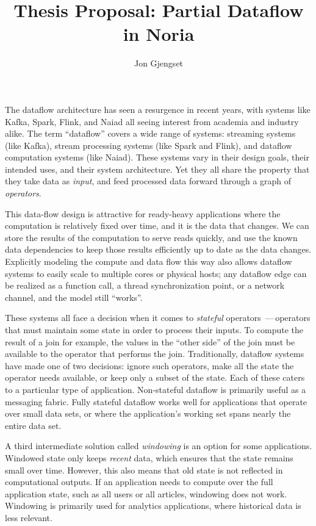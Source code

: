 \documentclass[12pt,letterpaper,twoside]{article}
\title{Thesis Proposal: Partial Dataflow in Noria}
\author{Jon Gjengset}
\begin{document}
\maketitle

The dataflow architecture has seen a resurgence in recent years, with systems
like Kafka\cite{kafka}, Spark\cite{spark,spark-streaming}, Flink\cite{flink}, and
Naiad\cite{naiad} all seeing interest from academia and industry alike. The term
``dataflow'' covers a wide range of systems: streaming systems (like Kafka),
stream processing systems (like Spark and Flink), and dataflow computation
systems (like Naiad). These systems vary in their design goals, their intended
uses, and their system architecture. Yet they all share the property that they
take data as \emph{input}, and feed processed data forward through a graph of
\emph{operators}.

This data-flow design is attractive for ready-heavy applications where the
computation is relatively fixed over time, and it is the data that changes.
We can store the results of the computation to serve reads quickly, and use the
known data dependencies to keep those results efficiently up to date as the data
changes. Explicitly modeling the compute and data flow this way also allows
dataflow systems to easily scale to multiple cores or physical hosts; any
dataflow edge can be realized as a function call, a thread synchronization
point, or a network channel, and the model still ``works''.

These systems all face a decision when it comes to \emph{stateful} operators\,
---\,operators that must maintain some state in order to process their inputs.
To compute the result of a join for example, the values in the ``other side'' of
the join must be available to the operator that performs the join.
Traditionally, dataflow systems have made one of two decisions: ignore such
operators, make all the state the operator needs available, or keep only a
subset of the state. Each of these caters to a particular type of application.
Non-stateful dataflow is primarily useful as a messaging fabric. Fully stateful
dataflow works well for applications that operate over small data sets, or where
the application's working set spans nearly the entire data set.

A third intermediate solution called \emph{windowing} is an option for some
applications. Windowed state only keeps \emph{recent} data, which ensures that
the state remains small over time. However, this also means that old state is
not reflected in computational outputs. If an application needs to compute over
the full application state, such as all users or all articles, windowing does
not work. Windowing is primarily used for analytics applications, where
historical data is less relevant.
\end{document}
